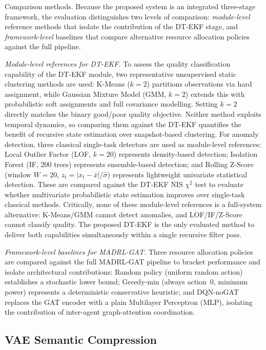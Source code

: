 \documentclass[conference]{IEEEtran}
\begin{document}
Comparison methods.
Because the proposed system is an integrated three-stage framework, the
evaluation distinguishes two levels of comparison: \textit{module-level}
reference methods that isolate the contribution of the DT-EKF stage, and
\textit{framework-level} baselines that compare alternative resource
allocation policies against the full pipeline.

\textit{Module-level references for DT-EKF.}
To assess the quality classification capability of the DT-EKF module,
two representative unsupervised static clustering methods are used:
K-Means ($k=2$) partitions observations via hard assignment, while
Gaussian Mixture Model (GMM, $k=2$) extends this with probabilistic
soft assignments and full covariance modelling.
Setting $k=2$ directly matches the binary good/poor quality objective.
Neither method exploits temporal dynamics, so comparing them against the
DT-EKF quantifies the benefit of recursive state estimation over
snapshot-based clustering.
For anomaly detection, three classical single-task detectors are used
as module-level references:
Local Outlier Factor (LOF, $k=20$) represents density-based detection;
Isolation Forest (IF, 200 trees) represents ensemble-based detection;
and Rolling Z-Score (window $W=20$, $z_t=|x_t-\bar{x}|/\hat{\sigma}$)
represents lightweight univariate statistical detection.
These are compared against the DT-EKF NIS $\chi^2$ test to evaluate
whether multivariate probabilistic state estimation improves over
single-task classical methods.
Critically, none of these module-level references is a full-system
alternative: K-Means/GMM cannot detect anomalies, and
LOF/IF/Z-Score cannot classify quality.
The proposed DT-EKF is the only evaluated method to deliver both
capabilities simultaneously within a single recursive filter pass.

\textit{Framework-level baselines for MADRL-GAT.}
Three resource allocation policies are compared against the full
MADRL-GAT pipeline to bracket performance and isolate architectural
contributions:
Random policy (uniform random action) establishes a stochastic lower bound;
Greedy-min (always action~0, minimum power) represents a deterministic
conservative heuristic; and DQN-noGAT replaces the GAT encoder with a
plain Multilayer Perceptron (MLP), isolating the contribution of
inter-agent graph-attention coordination.

\subsection{VAE Semantic Compression}
\end{document}
